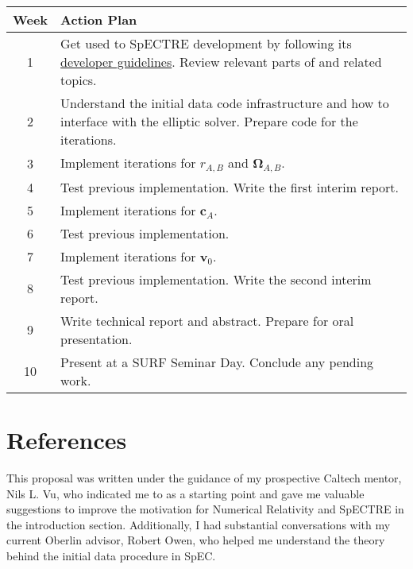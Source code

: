 \documentclass{../document}
\renewcommand{\v}[1]{\boldsymbol{#1}}
\begin{document}
	\begin{center}
		\setlength{\tabcolsep}{0.5cm}
		\def\arraystretch{1.5}
		\begin{tabular}{cp{}}
			\hline
			\textbf{Week} & \textbf{Action Plan} \\ \hline
			1 & Get used to SpECTRE development by following its \href{https://spectre-code.org/dev_guide.html}{developer guidelines}. Review relevant parts of \cite{Serguei} and related topics. \\
			2 & Understand the initial data code infrastructure and how to interface with the elliptic solver. Prepare code for the iterations. \\
			3 & Implement iterations for $r_{A,B}$ and $\v \Omega_{A,B}$. \\
			4 & Test previous implementation. Write the first interim report. \\
			5 & Implement iterations for $\v c_A$. \\
			6 & Test previous implementation. \\
			7 & Implement iterations for $\v v_0$. \\
			8 & Test previous implementation. Write the second interim report. \\
			9 & Write technical report and abstract. Prepare for oral presentation. \\
			10 & Present at a SURF Seminar Day. Conclude any pending work. \\ \hline
		\end{tabular}
	\end{center}

	\newpage

	\section{References}

	This proposal was written under the guidance of my prospective Caltech mentor, Nils L. Vu, who indicated me to \cite{Serguei} as a starting point and gave me valuable suggestions to improve the motivation for Numerical Relativity and SpECTRE in the introduction section. Additionally, I had substantial conversations with my current Oberlin advisor, Robert Owen, who helped me understand the theory behind the initial data procedure in SpEC.

	\printbibliography[heading=none]
\end{document}
